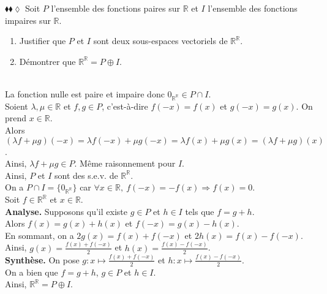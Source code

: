 \documentclass[11pt]{article}
\newcommand*{\R}{\mathbb{R}}
\begin{document}
\begin{exercise}{$\blacklozenge\blacklozenge\lozenge$}{}
    Soit $P$ l'ensemble des fonctions paires sur $\R$ et $I$ l'ensemble des fonctions impaires sur $\R$.
    \begin{enumerate}[topsep=0pt,itemsep=-0.9ex]
        \item Justifier que $P$ et $I$ sont deux sous-espaces vectoriels de $\R^\R$.
        \item Démontrer que $\R^\R = P \oplus I$.
    \end{enumerate}
    \tcblower\\[0.2cm]
     La fonction nulle est paire et impaire donc $0_{\R^\R} \in P \cap I$.\\
    Soient $\lambda, \mu \in \R$ et $f, g \in P$, c'est-à-dire $f(-x) = f(x)$ et $g(-x) = g(x)$. On prend $x\in\R$.\\
    Alors $(\lambda f + \mu g)(-x) = \lambda f(-x) + \mu g(-x) = \lambda f(x) + \mu g(x) = (\lambda f + \mu g)(x)$.\\
    Ainsi, $\lambda f + \mu g \in P$. Même raisonnement pour $I$.\\
    Ainsi, $P$ et $I$ sont des s.e.v. de $\R^\R$.\\[0.3cm]
     On a $P \cap I = \{0_{\R^\R}\}$ car $\forall x \in \R, ~  f(-x) = -f(x) \Rightarrow f(x) = 0$.\\
    Soit $f \in \R^\R$ et $x\in\R$. \\
    \textbf{Analyse.} Supposons qu'il existe $g \in P$ et $h \in I$ tels que $f = g + h$.\\
    Alors $f(x) = g(x) + h(x)$ et $f(-x)=g(x)-h(x)$.\\
    En sommant, on a $2g(x) = f(x) + f(-x)$ et $2h(x) = f(x) - f(-x)$.\\
    Ainsi, $g(x) = \frac{f(x) + f(-x)}{2}$ et $h(x) = \frac{f(x) - f(-x)}{2}$.\\[0.1cm]
    \textbf{Synthèse.} On pose $g : x \mapsto \frac{f(x) + f(-x)}{2}$ et $h : x \mapsto \frac{f(x) - f(-x)}{2}$.\\
    On a bien que $f = g + h$, $g \in P$ et $h \in I$.\\
    Ainsi, $\R^\R = P \oplus I$.
\end{exercise}
\end{document}
